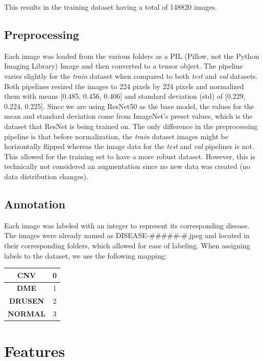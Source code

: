 \documentclass[11pt]{article}
\begin{document}
This results in the training dataset having a total of 148820 images.

\subsection{Preprocessing}

Each image was loaded from the various folders as a PIL (Pillow, not the Python Imaging Library) Image and then converted to a tensor object. The pipeline varies slightly for the \textit{train} dataset when compared to both \textit{test} and \textit{val} datasets. Both pipelines resized the images to 224 pixels by 224 pixels and normalized them with means [0.485, 0.456, 0.406] and standard deviation (std) of [0.229, 0.224, 0.225]. Since we are using ResNet50 as the base model, the values for the mean and standard deviation come from ImageNet's preset values, which is the dataset that ResNet is being trained on. The only difference in the preprocessing pipeline is that before normalization, the \textit{train} dataset images might be horizontally flipped whereas the image data for the \textit{test} and \textit{val} pipelines is not. This allowed for the training set to have a more robust dataset. However, this is technically not considered an augmentation since no new data was created (no data distribution changes).

\subsection{Annotation}
Each image was labeled with an integer to represent its corresponding disease. The images were already named as DISEASE-\#\#\#\#\#-\#.jpeg and located in their corresponding folders, which allowed for ease of labeling. When assigning labels to the dataset, we use the following mapping:

\begin{center}
    \begin{tabular}{| c | c |}
        \hline \hline
        \textbf{CNV}    & 0 \\
        \hline
        \textbf{DME}    & 1 \\
        \hline
        \textbf{DRUSEN} & 2 \\
        \hline
        \textbf{NORMAL} & 3 \\
        \hline \hline
    \end{tabular}
\end{center}

\section{Features}
\end{document}
